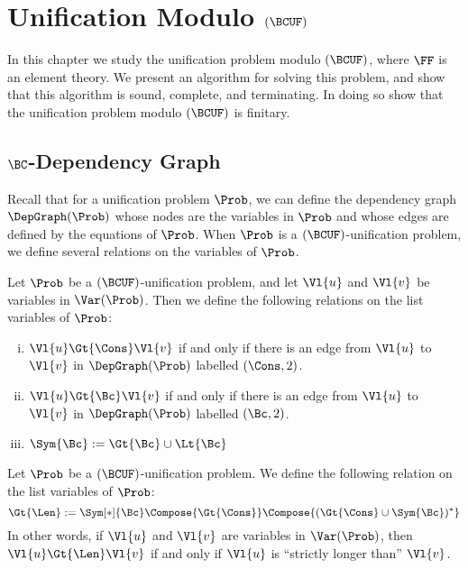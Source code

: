 \chapter{Unification Modulo $(\BCUF)$}\label{chap:unif-bcuh}

In this chapter we study the unification problem modulo $(\BCUF)$, where $\FF$
is an element theory. We present an algorithm for solving this problem, and
show that this algorithm is sound, complete, and terminating. In doing so show
that the unification problem modulo $(\BCUF)$ is finitary.

\section{$\BC$-Dependency Graph}

Recall that for a unification problem $\Prob$, we can define the dependency
graph $\DepGraph(\Prob)$ whose nodes are the variables in $\Prob$ and whose
edges are defined by the equations of $\Prob$. When $\Prob$ is a
$(\BCUF)$-unification problem, we define several relations on the variables
of $\Prob$.

\begin{Definition}
    Let $\Prob$ be a $(\BCUF)$-unification problem, and let $\Vl{u}$ and
    $\Vl{v}$ be variables in $\Var(\Prob)$. Then we define the following
    relations on the list variables of $\Prob$:
    \begin{enumerate}[(i)]
        \item $\Vl{u} \Gt{\Cons} \Vl{v}$ if and only if there is an edge from
            $\Vl{u}$ to $\Vl{v}$ in $\DepGraph(\Prob)$ labelled $(\Cons, 2)$.

        \item $\Vl{u} \Gt{\Bc} \Vl{v}$ if and only if there is an edge from
            $\Vl{u}$ to $\Vl{v}$ in $\DepGraph(\Prob)$ labelled $(\Bc, 2)$.

        \item ${\Sym{\Bc}} := {\Gt{\Bc}} \cup {\Lt{\Bc}}$
    \end{enumerate}
\end{Definition}

\begin{Definition}
    Let $\Prob$ be a $(\BCUF)$-unification problem. We define the following
    relation on the list variables of $\Prob$:
    \[ {\Gt{\Len}} := {\Sym[*]{\Bc}} \Compose {\Gt{\Cons}} \Compose
       {({\Gt{\Cons}} \cup {\Sym{\Bc}})^*} \]
    In other words, if $\Vl{u}$ and $\Vl{v}$ are variables in $\Var(\Prob)$,
    then $\Vl{u} \Gt{\Len} \Vl{v}$ if and only if $\Vl{u}$ is ``strictly longer
    than'' $\Vl{v}$.
\end{Definition}

